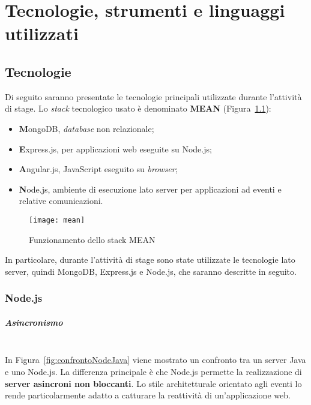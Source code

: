 \chapter{Tecnologie, strumenti e linguaggi utilizzati}\label{tecnologie}
\section{Tecnologie}
Di seguito saranno presentate le tecnologie principali utilizzate durante l'attività di stage. Lo \textit{stack} tecnologico usato è denominato \textbf{MEAN} (Figura~\ref{fig:mean}):
\begin{itemize}
\item \textbf{M}ongoDB, \textit{database} non relazionale;
\item \textbf{E}xpress.js,  per applicazioni web eseguite su Node.js;
\item \textbf{A}ngular.js,  JavaScript eseguito su \textit{browser};
\item \textbf{N}ode.js, ambiente di esecuzione lato server per applicazioni ad eventi e relative comunicazioni.
\end{itemize}
\begin{figure}[hbpc]
\begin{center}
\texttt{[image: mean]}
\caption[Funzionamento dello stack MEAN]{Funzionamento dello stack MEAN\protect\footnotemark}
\label{fig:mean}
\end{center}
\end{figure}
In particolare, durante l'attività di stage sono state utilizzate le tecnologie lato server, quindi MongoDB, Express.js e Node.js, che saranno descritte in seguito.

\subsection{Node.js}

\paragraph{Asincronismo} \mbox{} \\
In Figura~\ref{fig:confrontoNodeJava} viene mostrato un confronto tra un server Java e uno Node.js. La differenza principale è che Node.js permette la realizzazione di \textbf{server asincroni non bloccanti}. Lo stile architetturale orientato agli eventi lo rende particolarmente adatto a catturare la reattività di un'applicazione web.

